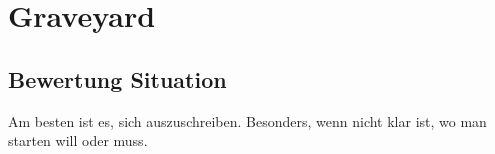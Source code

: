 \chapter{Graveyard}
\section{Bewertung Situation}

Am besten ist es, sich auszuschreiben. Besonders, wenn nicht klar ist, wo man starten will oder muss.

